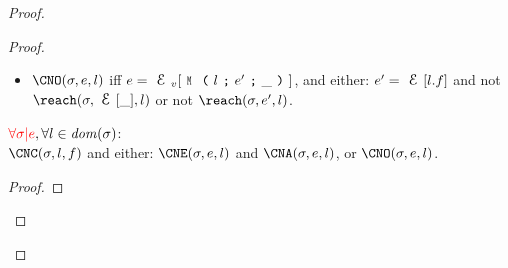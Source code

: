\begin{Assumption}
\begin{Assumption}
\begin{Assumption}
\begin{proof}
\begin{proof}
\begin{ienumerate}
\begin{enumerate}
\begin{itemize}
\item $\CNO(\s, e, l)$ iff $e = \EV[\M{l}{e'}{\_}]$, and either:
\qindent $e' = \E[l.f]$ and not $\reach(\s, \E[\_], l)$ or 
\qindent not $\reach(\s, e', l)$.

\end{itemize}

\begin{theorem}\rm
$\gap{\forall \s|e},\forall l \in \mathit{dom}(\s)$:\\
\indent $\CNC(\s, l, f)$ and either:
\qindent $\CNE(\s, e, l)$ and $\CNA(\s, e, l)$, or
\qindent $\CNO(\s, e, l)$.
\end{theorem}
\begin{proof}
\end{proof}
\end{enumerate}
\end{ienumerate}
\end{proof}
\end{proof}
\end{Assumption}
\end{Assumption}
\end{Assumption}
